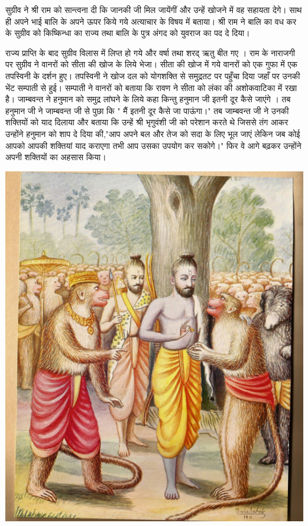 \documentclass[makeidx, 10pt, oneside, onecolumn, openright, final, svgnames, dvipsnames, extrafontsizes]{memoir}
\begin{document}
सुग्रीव ने श्री राम को सान्त्वना दी कि जानकी जी मिल जायेंगीं और उन्हें खोजने में वह सहायता देगे। साथ ही अपने भाई बालि के अपने ऊपर किये गये अत्याचार के विषय में बताया। श्री राम ने बालि का वध कर के सुग्रीव को किष्किन्धा का राज्य तथा बालि के पुत्र अंगद को युवराज का पद दे दिया।



राज्य प्राप्ति के बाद सुग्रीव विलास में लिप्त हो गये और वर्षा तथा शरद् ऋतु बीत गए । राम के नाराजगी पर सुग्रीव ने वानरों को सीता की खोज के लिये भेजा। सीता की खोज में गये वानरों को एक गुफा में एक तपस्विनी के दर्शन हुए। तपस्विनी ने खोज दल को योगशक्ति से समुद्रतट पर पहुँचा दिया जहाँ पर उनकी भेंट सम्पाती से हुई। सम्पाती ने वानरों को बताया कि रावण ने सीता को लंका की अशोकवाटिका में रखा है। जाम्बवन्त ने हनुमान को समुद्र लांघने के लिये कहा किन्तु हनुमान जी इतनी दूर कैसे जाएंगे । तब हनुमान जी ने जाम्बवन्त जी से पुछा कि " मैं इतनी दूर कैसे जा पाऊंगा।" तब जाम्बवन्त जी ने उनकी शक्तियों को याद दिलाया और बताया कि उन्हें श्री भृगुवंशी जी को परेशान करते थे जिससे तंग आकर उन्होंने हनुमान को शाप दे दिया की,"आप अपने बल और तेज को सदा के लिए भूल जाएं लेकिन जब कोई आपको आपकी शक्तियां याद कराएगा तभी आप उसका उपयोग कर सकोगे।" फिर वे आगे बढ़कर उन्होंने अपनी शक्तियों का अहसास किया। 

 \begin{center}
\includegraphics[scale=0.27]{The_Signet_Ring.jpg}
\end{center}
\end{document}
